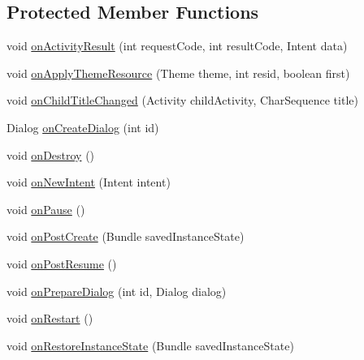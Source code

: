 \subsection*{Protected Member Functions}
\begin{DoxyCompactItemize}
\item 
void \hyperlink{classorg_1_1qtproject_1_1qt5_1_1android_1_1bindings_1_1_qt_activity_a4e9a7c6b28384e4d5f713462207ffc41}{on\+Activity\+Result} (int request\+Code, int result\+Code, Intent data)
\item 
void \hyperlink{classorg_1_1qtproject_1_1qt5_1_1android_1_1bindings_1_1_qt_activity_acd279279e5ad448d802fa31b64a30aef}{on\+Apply\+Theme\+Resource} (Theme theme, int resid, boolean first)
\item 
void \hyperlink{classorg_1_1qtproject_1_1qt5_1_1android_1_1bindings_1_1_qt_activity_ac300f488c368a77573a3ecbf90f88b3c}{on\+Child\+Title\+Changed} (Activity child\+Activity, Char\+Sequence title)
\item 
Dialog \hyperlink{classorg_1_1qtproject_1_1qt5_1_1android_1_1bindings_1_1_qt_activity_a94b7cad79823109fd5ce75385766144b}{on\+Create\+Dialog} (int id)
\item 
void \hyperlink{classorg_1_1qtproject_1_1qt5_1_1android_1_1bindings_1_1_qt_activity_a30832553da49ca0dea222e062e21710c}{on\+Destroy} ()
\item 
void \hyperlink{classorg_1_1qtproject_1_1qt5_1_1android_1_1bindings_1_1_qt_activity_a995502b7cf803efcecc91d345b030404}{on\+New\+Intent} (Intent intent)
\item 
void \hyperlink{classorg_1_1qtproject_1_1qt5_1_1android_1_1bindings_1_1_qt_activity_a54af4563a2a1f3ea73187c2e9b9b042c}{on\+Pause} ()
\item 
void \hyperlink{classorg_1_1qtproject_1_1qt5_1_1android_1_1bindings_1_1_qt_activity_a1a206c815af224d5bf06e5c921f4fdd4}{on\+Post\+Create} (Bundle saved\+Instance\+State)
\item 
void \hyperlink{classorg_1_1qtproject_1_1qt5_1_1android_1_1bindings_1_1_qt_activity_af23189d66db86a4a4356af8481450fa1}{on\+Post\+Resume} ()
\item 
void \hyperlink{classorg_1_1qtproject_1_1qt5_1_1android_1_1bindings_1_1_qt_activity_a7c23883f7117af2b20250150e032935d}{on\+Prepare\+Dialog} (int id, Dialog dialog)
\item 
void \hyperlink{classorg_1_1qtproject_1_1qt5_1_1android_1_1bindings_1_1_qt_activity_a05a1cabee75d99161959de7575052b73}{on\+Restart} ()
\item 
void \hyperlink{classorg_1_1qtproject_1_1qt5_1_1android_1_1bindings_1_1_qt_activity_a0dd64ece074eb6909bb384a63105083b}{on\+Restore\+Instance\+State} (Bundle saved\+Instance\+State)

\end{DoxyCompactItemize}
